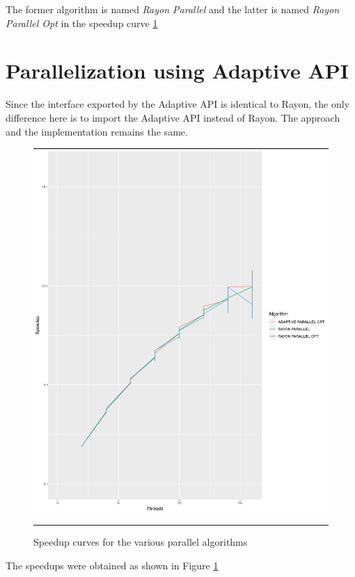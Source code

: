 The former algorithm is named \emph{Rayon Parallel} and the latter is named \emph{Rayon Parallel Opt} in the speedup curve \ref{fig:speedups}

\section{Parallelization using Adaptive API}
Since the interface exported by the Adaptive API is identical to Rayon, the only difference here is to import the Adaptive API instead of Rayon. The approach and the implementation remains the same.

\begin{figure}%
    \includegraphics[scale=0.5]{Pictures/speedups.png}
	\rule{40em}{0.5pt}
    \caption[Optimization]{Speedup curves for the various parallel algorithms}
	\label{fig:speedups}
\end{figure}
The speedups were obtained as shown in Figure \ref{fig:speedups}



